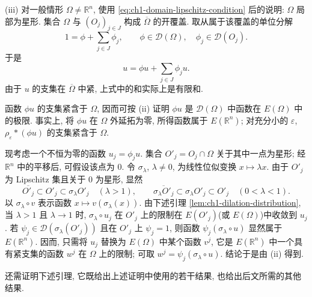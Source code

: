 \begin{Proof}
(iii) 对一般情形 $\Omega\neq\mathbb R^n$, 使用 \eqref{eq:ch1-domain-lipschitz-condition} 后的说明: $\Omega$ 局部为星形. 集合 $\Omega$ 与 $(O_j)_{j\in J}$ 构成 $\overline\Omega$ 的开覆盖. 取从属于该覆盖的单位分解
\begin{equation}
1=\phi+\sum_{j\in J}\phi_j,
\qquad \phi\in\mathcal D(\Omega),\quad\phi_j\in\mathcal D(O_j).
\label{eq:ch1-partition-of-unity}
\end{equation}
于是
\[
u=\phi u+\sum_{j\in J}\phi_j u.
\]
由于 $u$ 的支集在 $\overline\Omega$ 中紧, 上式中的和实际上是有限和.

函数 $\phi u$ 的支集紧含于 $\Omega$, 因而可按 (ii) 证明 $\phi u$ 是 $\mathbf{\mathcal D}(\Omega)$ 中函数在 $E(\Omega)$ 中的极限. 事实上, 将 $\phi u$ 在 $\Omega$ 外延拓为零, 所得函数属于 $E(\mathbb R^n)$; 对充分小的 $\varepsilon$, $\rho_\varepsilon*(\phi u)$ 的支集紧含于 $\Omega$.

现考虑一个不恒为零的函数 $u_j=\phi_j u$. 集合 $O'_j=O_j\cap\Omega$ 关于其中一点为星形; 经 $\mathbb R^n$ 中的平移后, 可假设该点为 $0$. 令 $\sigma_\lambda$, $\lambda\neq0$, 为线性位似变换 $x\mapsto\lambda x$. 由于 $O'_j$ 为 Lipschitz 集且关于 $0$ 为星形, 显然
\[
\overline{O'_j}\subset O'_j\subset\sigma_\lambda O'_j\quad(\lambda>1),
\qquad
\overline{\sigma_\lambda O'_j}\subset\sigma_\lambda O'_j\subset O'_j\quad(0<\lambda<1).
\]
以 $\sigma_\lambda\circ v$ 表示函数 $x\mapsto v(\sigma_\lambda(x))$. 由下述引理 \ref{lem:ch1-dilation-distribution}, 当 $\lambda>1$ 且 $\lambda\to1$ 时, $\sigma_\lambda\circ u_j$ 在 $O'_j$ 上的限制在 $E(O'_j)$(或 $E(\Omega)$)中收敛到 $u_j$. 若 $\psi_j\in\mathcal D(\sigma_\lambda(O'_j))$ 且在 $O'_j$ 上 $\psi_j=1$, 则函数 $\psi_j(\sigma_\lambda\circ u)$ 显然属于 $E(\mathbb R^n)$. 因而, 只需将 $u_j$ 替换为 $E(\Omega)$ 中某个函数 $v^j$, 它是 $E(\mathbb R^n)$ 中一个具有紧支集的函数 $w^j$ 在 $\Omega$ 上的限制; 可取 $w^j=\psi_j(\sigma_\lambda\circ u)$. 结论于是由 (ii) 得到.
\end{Proof}

还需证明下述引理, 它既给出上述证明中使用的若干结果, 也给出后文所需的其他结果.

